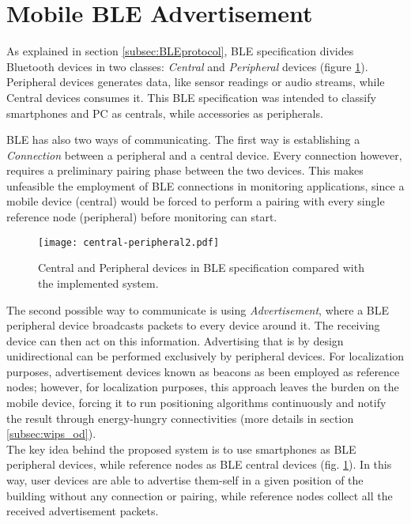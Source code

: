 \section{Mobile BLE Advertisement}
\label{sec:advertisement}
As explained in section \ref{subsec:BLEprotocol}, BLE specification divides Bluetooth devices in two classes: \emph{Central} and \emph{Peripheral} devices (figure \ref{fig:cent-per}). Peripheral devices generates data, like sensor readings or audio streams, while Central devices consumes it. This BLE specification was intended to classify smartphones and PC as centrals, while accessories as peripherals.

BLE has also two ways of communicating. The first way is establishing a \emph{Connection} between a peripheral and a central device. Every connection however, requires a preliminary pairing phase between the two devices. This makes unfeasible the employment of BLE connections in monitoring applications, since a mobile device (central) would be forced to perform a pairing with every single reference node (peripheral) before monitoring can start.

\begin{figure}[h!tb]
\centering
\texttt{[image: central-peripheral2.pdf]}
\caption[Central and Peripheral devices in BLE specification and the implemented system.]{Central and Peripheral devices in BLE specification compared with the implemented system.}
\label{fig:cent-per}
\end{figure}

The second possible way to communicate is using \emph{Advertisement}, where a BLE peripheral device broadcasts packets to every device around it. The receiving device can then act on this information.
Advertising that is by design unidirectional can be performed exclusively by peripheral devices.
For localization purposes, advertisement devices known as beacons as been employed as reference nodes; however, for localization purposes, this approach leaves the burden on the mobile device, forcing it to run positioning algorithms continuously and notify the result through energy-hungry connectivities (more details in section \ref{subsec:wips_od}).\\
The key idea behind the proposed system is to use smartphones as BLE peripheral devices, while reference nodes as BLE central devices (fig. \ref{fig:cent-per}). In this way, user devices are able to advertise them-self in a given position of the building without any connection or pairing, while reference nodes collect all the received advertisement packets.

